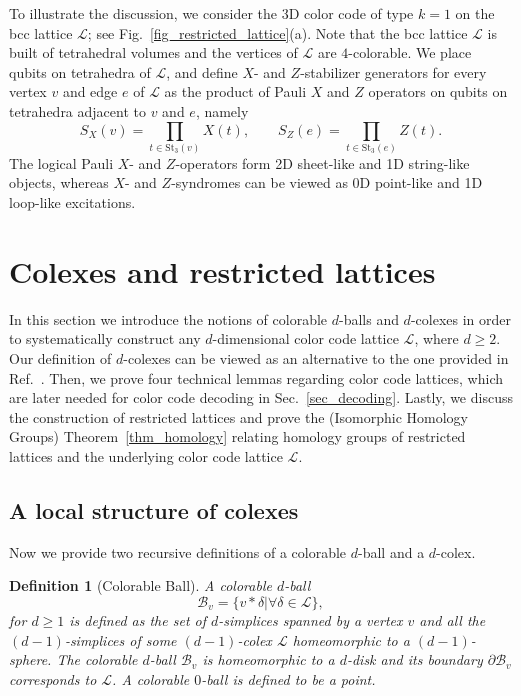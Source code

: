 \documentclass[onecolumn,letterpaper,11pt,accepted=2022-12-19]{quantumarticle}
\renewcommand{\star}[2]{{\mathrm{St}_{#1}(#2)}}
\newtheorem{definition}{Definition}
\theoremstyle{definition}
\theoremstyle{lemma}
\theoremstyle{theorem}
\theoremstyle{corollary}
\begin{document}
{To illustrate the discussion, we consider the 3D color code of type $k=1$ on the bcc lattice $\mathcal{L}$; see Fig.~\ref{fig_restricted_lattice}(a).
Note that the bcc lattice $\mathcal{L}$ is built of tetrahedral volumes and the vertices of $\mathcal{L}$ are $4$-colorable.
We place qubits on tetrahedra of $\mathcal{L}$, and define $X$- and $Z$-stabilizer generators for every vertex $v$ and edge $e$ of $\mathcal{L}$ as the product of Pauli $X$ and $Z$ operators on qubits on tetrahedra adjacent to $v$ and $e$, namely
\begin{equation}
S_X(v) = \prod_{t\in\star{3}{v}} X(t),\quad\quad
S_Z(e) = \prod_{t\in\star{3}{e}} Z(t).
\end{equation}
The logical Pauli $X$- and $Z$-operators form 2D sheet-like  and 1D string-like objects, whereas $X$- and $Z$-syndromes can be viewed as 0D point-like and 1D loop-like excitations.



\section{Colexes and restricted lattices}  
\label{sec_lattices}

In this section we introduce the notions of colorable $d$-balls and $d$-colexes in order to systematically construct any $d$-dimensional color code lattice $\mathcal{L}$, where $d\geq 2$.
Our definition of $d$-colexes can be viewed as an alternative to the one provided in Ref.~\cite{Bombin2007}.
Then, we prove four technical lemmas regarding color code lattices, which are later needed for color code decoding in Sec.~\ref{sec_decoding}.
Lastly, we discuss the construction of restricted lattices and prove the (Isomorphic Homology Groups) Theorem~\ref{thm_homology} relating homology groups of restricted lattices and the underlying color code lattice $\mathcal{L}$.


\subsection{A local structure of colexes}
\label{sec_colexes}


Now we provide two recursive definitions of a colorable $d$-ball and a $d$-colex.

\begin{definition}[Colorable Ball]
A colorable $d$-ball
\begin{equation}
\mathcal{B}_v = \{ v*\delta | \forall \delta\in {\mathcal{L}} \},
\end{equation}
for $d\geq 1$ is defined as the set of $d$-simplices spanned by a vertex $v$ and all the $(d-1)$-simplices of some $(d-1)$-colex $\mathcal{L}$ homeomorphic to a $(d-1)$-sphere.
The colorable $d$-ball $\mathcal{B}_v$ is homeomorphic to a $d$-disk and its boundary $\partial\mathcal{B}_v$ corresponds to $\mathcal{L}$.
A colorable $0$-ball is defined to be a point.
\end{definition}


}
\end{document}
